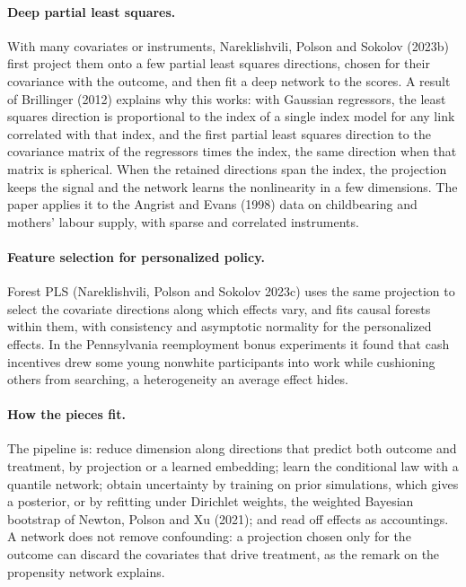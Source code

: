 \paragraph{Deep partial least squares.} With many covariates or instruments, Nareklishvili, Polson and Sokolov (2023b) first project them onto a few partial least squares directions, chosen for their covariance with the outcome, and then fit a deep network to the scores. A result of Brillinger (2012) explains why this works: with Gaussian regressors, the least squares direction is proportional to the index of a single index model for any link correlated with that index, and the first partial least squares direction to the covariance matrix of the regressors times the index, the same direction when that matrix is spherical. When the retained directions span the index, the projection keeps the signal and the network learns the nonlinearity in a few dimensions. The paper applies it to the Angrist and Evans (1998) data on childbearing and mothers' labour supply, with sparse and correlated instruments.

\paragraph{Feature selection for personalized policy.} Forest PLS (Nareklishvili, Polson and Sokolov 2023c) uses the same projection to select the covariate directions along which effects vary, and fits causal forests within them, with consistency and asymptotic normality for the personalized effects. In the Pennsylvania reemployment bonus experiments it found that cash incentives drew some young nonwhite participants into work while cushioning others from searching, a heterogeneity an average effect hides.



\paragraph{How the pieces fit.} The pipeline is: reduce dimension along directions that predict both outcome and treatment, by projection or a learned embedding; learn the conditional law with a quantile network; obtain uncertainty by training on prior simulations, which gives a posterior, or by refitting under Dirichlet weights, the weighted Bayesian bootstrap of Newton, Polson and Xu (2021); and read off effects as accountings. A network does not remove confounding: a projection chosen only for the outcome can discard the covariates that drive treatment, as the remark on the propensity network explains.

